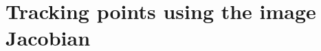 \chapter{Tracking points using the image Jacobian} %
\label{chap:tracking_points_using_the_image_jacobian}

